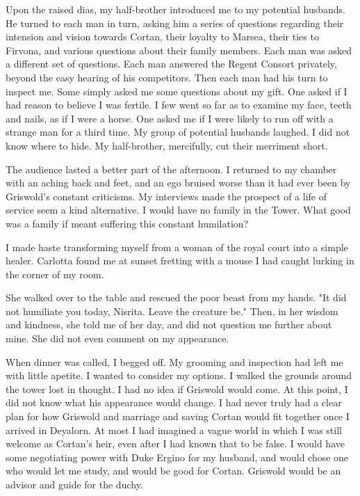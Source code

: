 \documentclass{article}
\begin{document}
Upon the raised dias, my half-brother introduced me to my potential husbands. He turned to each man in turn, asking him a series of questions regarding their intension and vision towards Cortan, their loyalty to Marsea, their ties to Firvona, and various questions about their family members. Each man was asked a different set of questions. Each man answered the Regent Consort privately, beyond the easy hearing of his competitors. Then each man had his turn to inspect me. Some simply asked me some questions about my gift. One asked if I had reason to believe I was fertile. I few went so far as to examine my face, teeth and nails, as if I were a horse. One asked me if I were likely to run off with a strange man for a third time. My group of potential husbands laughed. I did not know where to hide. My half-brother, mercifully, cut their merriment short. 

The audience lasted a better part of the afternoon. I returned to my chamber with an aching back and feet, and an ego bruised worse than it had ever been by Griswold's constant criticisms. My interviews made the prospect of a life of service seem a kind alternative. I would have no family in the Tower. What good was a family if meant suffering this constant humilation? 

\vspace{.5cm}

I made haste transforming myself from a woman of the royal court into a simple healer. Carlotta found me at sunset fretting with a mouse I had caught lurking in the corner of my room.

She walked over to the table and rescued the poor beast from my hands. "It did not humiliate you today, Nisrita. Leave the creature be." Then, in her wisdom and kindness, she told me of her day, and did not question me further about mine. She did not even comment on my appearance.

When dinner was called, I begged off. My grooming and inspection had left me with little apetite. I wanted to consider my options. I walked the grounds around the tower lost in thought. I had no idea if Griswold would come. At this point, I did not know what his appearance would change. I had never truly had a clear plan for how Griswold and marriage and saving Cortan would fit together once I arrived in Deyalorn. At most I had imagined a vague world in which I was still welcome as Cortan's heir, even after I had known that to be false. I would have some negotiating power with Duke Ergino for my husband, and would chose one who would let me study, and would be good for Cortan. Griswold would be an advisor and guide for the duchy. 
\end{document}

